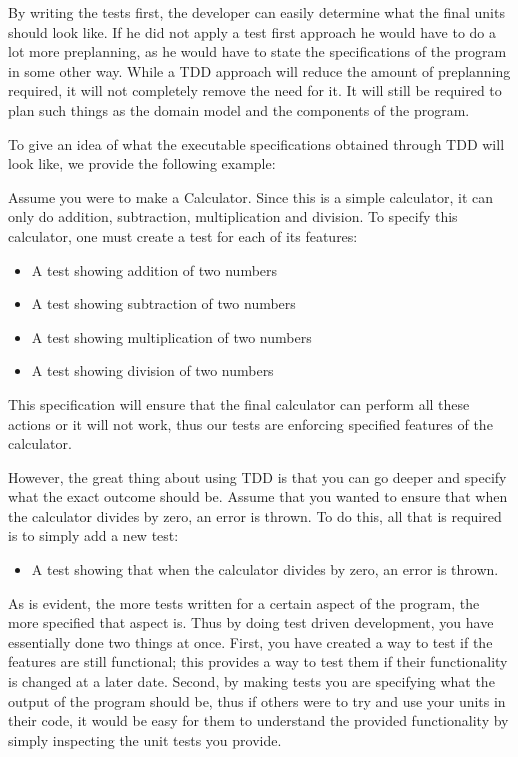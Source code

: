 By writing the tests first, the developer can easily determine what
the final units should look like. If he did not apply a test first
approach he would have to do a lot more preplanning, as he would have
to state the specifications of the program in some other way. While
a TDD approach will reduce the amount of preplanning required, it
will not completely remove the need for it. It will still be required
to plan such things as the domain model and the components of the
program. 

To give an idea of what the executable specifications obtained through
TDD will look like, we provide the following example:

Assume you were to make a Calculator. Since this is a simple calculator,
it can only do addition, subtraction, multiplication and division.
To specify this calculator, one must create a test for each of its
features:
\begin{itemize}
\item A test showing addition of two numbers 
\item A test showing subtraction of two numbers 
\item A test showing multiplication of two numbers 
\item A test showing division of two numbers
\end{itemize}
This specification will ensure that the final calculator can perform
all these actions or it will not work, thus our tests are enforcing
specified features of the calculator.

However, the great thing about using TDD is that you can go deeper
and specify what the exact outcome should be. Assume that you wanted
to ensure that when the calculator divides by zero, an error is thrown.
To do this, all that is required is to simply add a new test:
\begin{itemize}
\item A test showing that when the calculator divides by zero, an error
is thrown.
\end{itemize}
As is evident, the more tests written for a certain aspect of the
program, the more specified that aspect is. Thus by doing test driven
development, you have essentially done two things at once. First,
you have created a way to test if the features are still functional;
this provides a way to test them if their functionality is changed
at a later date. Second, by making tests you are specifying what the
output of the program should be, thus if others were to try and use
your units in their code, it would be easy for them to understand
the provided functionality by simply inspecting the unit tests you
provide.


